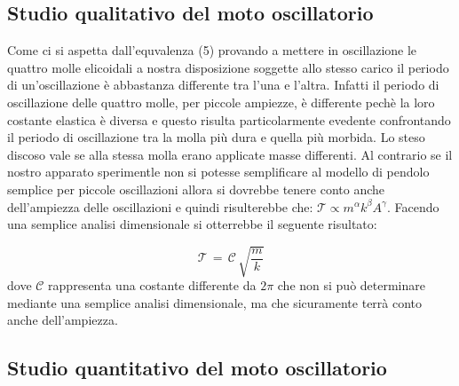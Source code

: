 \subsection{Studio qualitativo del moto oscillatorio}
Come ci si aspetta dall'equvalenza (5) provando a mettere in oscillazione le quattro molle elicoidali a nostra disposizione soggette allo stesso carico il periodo di un'oscillazione è abbastanza differente tra l'una e l'altra. Infatti il periodo di oscillazione delle quattro molle, per piccole ampiezze, è differente pechè la loro costante elastica è diversa e questo risulta particolarmente evedente confrontando il periodo di oscillazione tra la molla più dura e quella più morbida. Lo steso discoso vale se alla stessa molla erano applicate masse differenti.
Al contrario se il nostro apparato sperimentle non si potesse semplificare al modello di pendolo semplice per piccole oscillazioni allora si dovrebbe tenere conto anche dell'ampiezza delle oscillazioni e quindi risulterebbe che: $\mathcal{T} \propto m^\alpha k^\beta A^\gamma$. Facendo una semplice analisi dimensionale si otterrebbe il seguente risultato:

\begin{equation*}
	\mathcal{T} \,=\, \mathcal{C} \, \sqrt{\frac{m}{k}}
\end{equation*}
%
dove $\mathcal{C}$ rappresenta una costante differente da $2 \pi$ che non si può determinare mediante una semplice analisi dimensionale, ma che sicuramente terrà conto anche dell'ampiezza.

\subsection{Studio quantitativo del moto oscillatorio}





 




